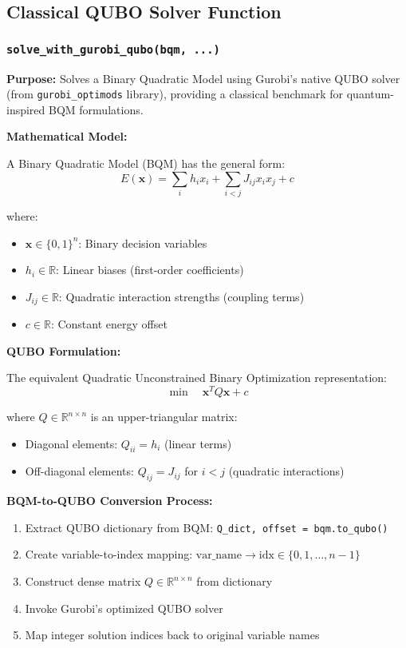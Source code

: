 \documentclass{article}
\begin{document}
\subsection{Classical QUBO Solver Function}

\subsubsection{\texttt{solve\_with\_gurobi\_qubo(bqm, ...)}}

\textbf{Purpose:} Solves a Binary Quadratic Model using Gurobi's native QUBO solver (from \texttt{gurobi\_optimods} library), providing a classical benchmark for quantum-inspired BQM formulations.

\textbf{Mathematical Model:}

A Binary Quadratic Model (BQM) has the general form:
$$E(\mathbf{x}) = \sum_i h_i x_i + \sum_{i<j} J_{ij} x_i x_j + c$$

where:
\begin{itemize}
    \item $\mathbf{x} \in \{0, 1\}^n$: Binary decision variables
    \item $h_i \in \mathbb{R}$: Linear biases (first-order coefficients)
    \item $J_{ij} \in \mathbb{R}$: Quadratic interaction strengths (coupling terms)
    \item $c \in \mathbb{R}$: Constant energy offset
\end{itemize}

\textbf{QUBO Formulation:}

The equivalent Quadratic Unconstrained Binary Optimization representation:
$$\min \quad \mathbf{x}^T Q \mathbf{x} + c$$

where $Q \in \mathbb{R}^{n \times n}$ is an upper-triangular matrix:
\begin{itemize}
    \item Diagonal elements: $Q_{ii} = h_i$ (linear terms)
    \item Off-diagonal elements: $Q_{ij} = J_{ij}$ for $i < j$ (quadratic interactions)
\end{itemize}

\textbf{BQM-to-QUBO Conversion Process:}
\begin{enumerate}
    \item Extract QUBO dictionary from BQM: \texttt{Q\_dict, offset = bqm.to\_qubo()}
    \item Create variable-to-index mapping: $\text{var\_name} \rightarrow \text{idx} \in \{0, 1, \ldots, n-1\}$
    \item Construct dense matrix $Q \in \mathbb{R}^{n \times n}$ from dictionary
    \item Invoke Gurobi's optimized QUBO solver
    \item Map integer solution indices back to original variable names
\end{enumerate}
\end{document}
